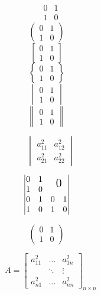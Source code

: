 \documentclass{ctexart}
\begin{document}
	\[
		\begin{matrix}
			0 & 1\\
			1 & 0
		\end{matrix}
	\]
	\[
		\begin{pmatrix}
			0 & 1\\
			1 & 0
		\end{pmatrix}	\quad
	\]
	\[
		\begin{bmatrix}
			0 & 1\\
			1 & 0
		\end{bmatrix}	\quad
	\]
	\[
		\begin{Bmatrix}
			0 & 1\\
			1 & 0
		\end{Bmatrix}	\quad
	\]
	\[
		\begin{vmatrix}
			0 & 1\\
			1 & 0
		\end{vmatrix}	\quad
	\]
	\[
		\begin{Vmatrix}
			0 & 1\\
			1 & 0
		\end{Vmatrix}	\quad
	\]
	
	\[
		\begin{vmatrix}
			{a_{11}^{2}} & {a_{12}^{2}}\\
			{a_{21}^{2}} & {a_{22}^{2}}
		\end{vmatrix}
	\]
	
	\[
		\begin{vmatrix}
			\begin{matrix}
			0 & 1\\
			1 & 0
			\end{matrix}
			 
			&
			 
			\text{\Large 0}\\
		
			\begin{matrix}
			0 & 1\\
			1 & 0
			\end{matrix}
			
			 &
			\begin{matrix}
			0 & 1\\
			1 & 0
			\end{matrix}
		\end{vmatrix}	\quad
	\]
	
	\[
		\begin{pmatrix}
			0 & 1\\
			1 & 0
		\end{pmatrix}	\quad
	\]
	
	\[
		A = \begin{bmatrix}
				{a_{11}^{2}} & \dots & {a_{1n}^{2}}\\	%
				& \ddots & \vdots\\	%
				{a_{n1}^{2}} & \dots & {a_{nn}^{2}}
			\end{bmatrix}_{n \times n}
	\]
\end{document}

